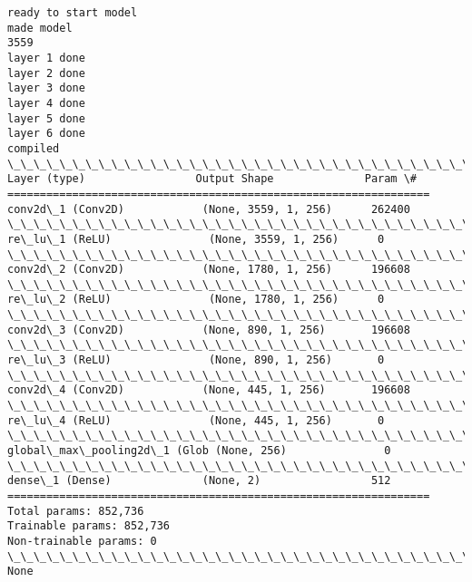 \documentclass[11pt]{article}
\begin{document}
    \begin{Verbatim}[commandchars=\\\{\}]
ready to start model
made model
3559
layer 1 done
layer 2 done
layer 3 done
layer 4 done
layer 5 done
layer 6 done
compiled
\_\_\_\_\_\_\_\_\_\_\_\_\_\_\_\_\_\_\_\_\_\_\_\_\_\_\_\_\_\_\_\_\_\_\_\_\_\_\_\_\_\_\_\_\_\_\_\_\_\_\_\_\_\_\_\_\_\_\_\_\_\_\_\_\_
Layer (type)                 Output Shape              Param \#   
=================================================================
conv2d\_1 (Conv2D)            (None, 3559, 1, 256)      262400    
\_\_\_\_\_\_\_\_\_\_\_\_\_\_\_\_\_\_\_\_\_\_\_\_\_\_\_\_\_\_\_\_\_\_\_\_\_\_\_\_\_\_\_\_\_\_\_\_\_\_\_\_\_\_\_\_\_\_\_\_\_\_\_\_\_
re\_lu\_1 (ReLU)               (None, 3559, 1, 256)      0         
\_\_\_\_\_\_\_\_\_\_\_\_\_\_\_\_\_\_\_\_\_\_\_\_\_\_\_\_\_\_\_\_\_\_\_\_\_\_\_\_\_\_\_\_\_\_\_\_\_\_\_\_\_\_\_\_\_\_\_\_\_\_\_\_\_
conv2d\_2 (Conv2D)            (None, 1780, 1, 256)      196608    
\_\_\_\_\_\_\_\_\_\_\_\_\_\_\_\_\_\_\_\_\_\_\_\_\_\_\_\_\_\_\_\_\_\_\_\_\_\_\_\_\_\_\_\_\_\_\_\_\_\_\_\_\_\_\_\_\_\_\_\_\_\_\_\_\_
re\_lu\_2 (ReLU)               (None, 1780, 1, 256)      0         
\_\_\_\_\_\_\_\_\_\_\_\_\_\_\_\_\_\_\_\_\_\_\_\_\_\_\_\_\_\_\_\_\_\_\_\_\_\_\_\_\_\_\_\_\_\_\_\_\_\_\_\_\_\_\_\_\_\_\_\_\_\_\_\_\_
conv2d\_3 (Conv2D)            (None, 890, 1, 256)       196608    
\_\_\_\_\_\_\_\_\_\_\_\_\_\_\_\_\_\_\_\_\_\_\_\_\_\_\_\_\_\_\_\_\_\_\_\_\_\_\_\_\_\_\_\_\_\_\_\_\_\_\_\_\_\_\_\_\_\_\_\_\_\_\_\_\_
re\_lu\_3 (ReLU)               (None, 890, 1, 256)       0         
\_\_\_\_\_\_\_\_\_\_\_\_\_\_\_\_\_\_\_\_\_\_\_\_\_\_\_\_\_\_\_\_\_\_\_\_\_\_\_\_\_\_\_\_\_\_\_\_\_\_\_\_\_\_\_\_\_\_\_\_\_\_\_\_\_
conv2d\_4 (Conv2D)            (None, 445, 1, 256)       196608    
\_\_\_\_\_\_\_\_\_\_\_\_\_\_\_\_\_\_\_\_\_\_\_\_\_\_\_\_\_\_\_\_\_\_\_\_\_\_\_\_\_\_\_\_\_\_\_\_\_\_\_\_\_\_\_\_\_\_\_\_\_\_\_\_\_
re\_lu\_4 (ReLU)               (None, 445, 1, 256)       0         
\_\_\_\_\_\_\_\_\_\_\_\_\_\_\_\_\_\_\_\_\_\_\_\_\_\_\_\_\_\_\_\_\_\_\_\_\_\_\_\_\_\_\_\_\_\_\_\_\_\_\_\_\_\_\_\_\_\_\_\_\_\_\_\_\_
global\_max\_pooling2d\_1 (Glob (None, 256)               0         
\_\_\_\_\_\_\_\_\_\_\_\_\_\_\_\_\_\_\_\_\_\_\_\_\_\_\_\_\_\_\_\_\_\_\_\_\_\_\_\_\_\_\_\_\_\_\_\_\_\_\_\_\_\_\_\_\_\_\_\_\_\_\_\_\_
dense\_1 (Dense)              (None, 2)                 512       
=================================================================
Total params: 852,736
Trainable params: 852,736
Non-trainable params: 0
\_\_\_\_\_\_\_\_\_\_\_\_\_\_\_\_\_\_\_\_\_\_\_\_\_\_\_\_\_\_\_\_\_\_\_\_\_\_\_\_\_\_\_\_\_\_\_\_\_\_\_\_\_\_\_\_\_\_\_\_\_\_\_\_\_
None

    \end{Verbatim}
\end{document}
